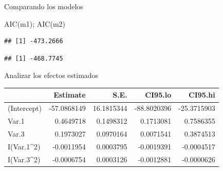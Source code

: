 \documentclass[
  11pt,
  ignorenonframetext,
]{beamer}
\newenvironment{Shaded}{}{}
\newcommand{\DecValTok}[1]{\textcolor[rgb]{0.25,0.63,0.44}{#1}}
\newcommand{\FunctionTok}[1]{\textcolor[rgb]{0.02,0.16,0.49}{#1}}
\newcommand{\NormalTok}[1]{#1}
\newcommand{\OtherTok}[1]{\textcolor[rgb]{0.00,0.44,0.13}{#1}}
\newcommand{\SpecialCharTok}[1]{\textcolor[rgb]{0.25,0.44,0.63}{#1}}
\begin{document}
\begin{frame}[fragile]{Comparando los modelos}
\protect\hypertarget{comparando-los-modelos}{}
\begin{Shaded}
\begin{Highlighting}[]
\FunctionTok{AIC}\NormalTok{(m1); }\FunctionTok{AIC}\NormalTok{(m2)}
\end{Highlighting}
\end{Shaded}

\begin{verbatim}
## [1] -473.2666
\end{verbatim}

\begin{verbatim}
## [1] -468.7745
\end{verbatim}
\end{frame}

\begin{frame}[fragile]{Analizar los efectos estimados}
\protect\hypertarget{analizar-los-efectos-estimados}{}
\begin{Shaded}
\end{Shaded}

\begin{longtable}[]{@{}lrrrr@{}}
\toprule()
& Estimate & S.E. & CI95.lo & CI95.hi \\
\midrule()
\endhead
(Intercept) & -57.0868149 & 16.1815344 & -88.8020396 & -25.3715903 \\
Var.1 & 0.4649718 & 0.1498312 & 0.1713081 & 0.7586355 \\
Var.3 & 0.1973027 & 0.0970164 & 0.0071541 & 0.3874513 \\
I(Var.1\^{}2) & -0.0011954 & 0.0003795 & -0.0019391 & -0.0004517 \\
I(Var.3\^{}2) & -0.0006754 & 0.0003126 & -0.0012881 & -0.0000626 \\
\bottomrule()
\end{longtable}
\end{frame}
\end{document}
